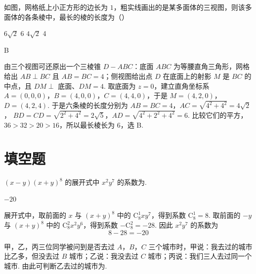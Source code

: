\begin{problem}
如图，网格纸上小正方形的边长为 \(1\)，粗实线画出的是某多面体的三视图，则该多面体的各条棱中，最长的棱的长度为（\quad）


\choices
    {\(6\sqrt{2}\)}
    {6}
    {\(4\sqrt{2}\)}
    {4}
\end{problem}

\begin{answer}
B
\end{answer}

\begin{solution}
由三个视图可还原出一个三棱锥 \(D-ABC\)：底面 \(ABC\) 为等腰直角三角形，网格给出
\(AB\perp BC\) 且 \(AB=BC=4\)；侧视图给出点 \(D\) 在底面上的射影 \(M\) 是
\(BC\) 的中点，且 \(DM\perp\) 底面、\(DM=4\). 取底面为 \(z=0\)，建立直角坐标系
\(A=(0,0,0)\)，\(B=(4,0,0)\)，\(C=(4,4,0)\)，于是
\(M=(4,2,0)\)，\(D=(4,2,4)\).
于是六条棱的长度分别为
\(AB=BC=4\)，\(AC=\sqrt{4^2+4^2}=4\sqrt2\)，
\(BD=CD=\sqrt{2^2+4^2}=2\sqrt5\)，\(AD=\sqrt{4^2+2^2+4^2}=6\).
比较它们的平方，\(36>32>20>16\)，所以最长棱长为 \(6\)，选 B.
\end{solution}

\section{填空题}

\begin{problem}
\((x - y)(x + y)^8\) 的展开式中 \(x^{2}y^{7}\) 的系数为\fillinblank{}.
\end{problem}

\begin{answer}
\(-20\)
\end{answer}

\begin{solution}
展开式中，取前面的 \(x\) 与 \((x+y)^8\) 中的
\(\mathrm C_8^1xy^7\)，得到系数 \(\mathrm C_8^1=8\). 取前面的 \(-y\) 与
\((x+y)^8\) 中的 \(\mathrm C_8^2x^2y^6\)，得到系数
\(-\mathrm C_8^2=-28\). 因此 \(x^2y^7\) 的系数为
\[
8-28=-20
\]
\end{solution}

\begin{problem}
甲，乙，丙三位同学被问到是否去过 \(A\)，\(B\)，\(C\) 三个城市时，甲说：我去过的城市比乙多，但没去过 \(B\) 城市；乙说：我没去过 \(C\) 城市；丙说：我们三人去过同一个城市. 由此可判断乙去过的城市为\fillinblank{}.
\end{problem}

